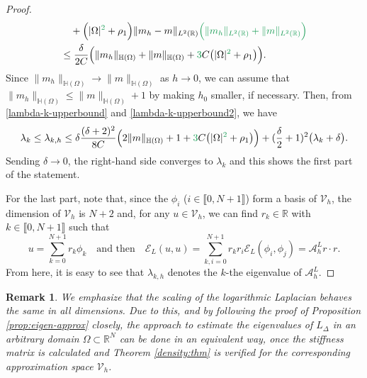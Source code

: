 \documentclass[10 pt]{article}
\newcommand\inter[1]{\llbracket #1\rrbracket}
\newtheorem{remark}[theorem]{Remark}
\numberwithin{equation}{section}
\def\R{\mathbb{R}}
\def\mH{\mathbb{H}}
\newcommand{\SJ}[1]{{\color{ForestGreen} #1}}  %
\begin{document}
\begin{proof}
\begin{align}
&\quad +\Big(|\Omega|^\SJ{2}+\rho_1\Big)\|m_h-m\|_{L^2(\R)}\SJ{\Big(\|m_h\|_{L^2(\R)}+\|m\|_{L^2(\R)}\Big)}\notag\\
&\leq \frac{\delta}{2C}\Big(\|m_h\|_{\mH(\Omega)}+\|m\|_{\mH(\Omega)}+\SJ{3}C\big(|\Omega|^\SJ{2}+\rho_1\big)\Big).\label{lambda-k-upperbound2}
\end{align}
Since $\|m_h\|_{\mH(\Omega)}\to \|m\|_{\mH(\Omega)}$ as $h\to 0$, we can assume that
$\|m_h\|_{\mH(\Omega)}\leq \|m\|_{\mH(\Omega)}+1$ by making $h_0$ smaller, if necessary. Then, from \eqref{lambda-k-upperbound} and \eqref{lambda-k-upperbound2}, we have
\begin{align*}
\lambda_k\leq \lambda_{k,h}
\leq 
\delta\frac{(\delta+2)^2}{8C}\Big(2\|m\|_{\mH(\Omega)}+1+\SJ{3}C\big(|\Omega|^\SJ{2}+\rho_1\big)\Big)
+
( \frac{\delta}{2}+1)^2\big(\lambda_k+\delta\big).
\end{align*}
Sending $\delta\to 0$, the right-hand side converges to $\lambda_k$ and this shows the first part of the statement. 

For the last part, note that, since the $\phi_i$ ($i\in\inter{0,N+1}$) form a basis of $\mathcal{V}_h$, the dimension of $\mathcal{V}_{h}$ is $N+2$ and, for any $u\in \mathcal{V}_{h}$, we can find $r_k\in \R$ with $k\in \inter{0,N+1}$ such that
$$
u=\sum_{k=0}^{N+1}r_k\phi_k\quad\text{and then}\quad \mathcal{E}_L(u,u)=\sum_{k,i=0}^{N+1}r_kr_i\mathcal{E}_L(\phi_i,\phi_j)= \mathcal{A}^L_h r\cdot r.
$$
From here, it is easy to see that $\lambda_{k,h}$ denotes the $k$-the eigenvalue of $\mathcal{A}^L_{h}$.
\end{proof}



\begin{remark}
We emphasize that the scaling of the logarithmic Laplacian behaves the same in all dimensions. Due to this, and by following the proof of Proposition \ref{prop:eigen-approx} closely, the approach to estimate the eigenvalues of $L_{\Delta}$ in an arbitrary domain $\Omega\subset\R^N$ can be done in an equivalent way, once the stiffness matrix is calculated and Theorem \ref{density:thm} is verified for the corresponding approximation space $\mathcal{V}_h$.
\end{remark}
\end{document}
